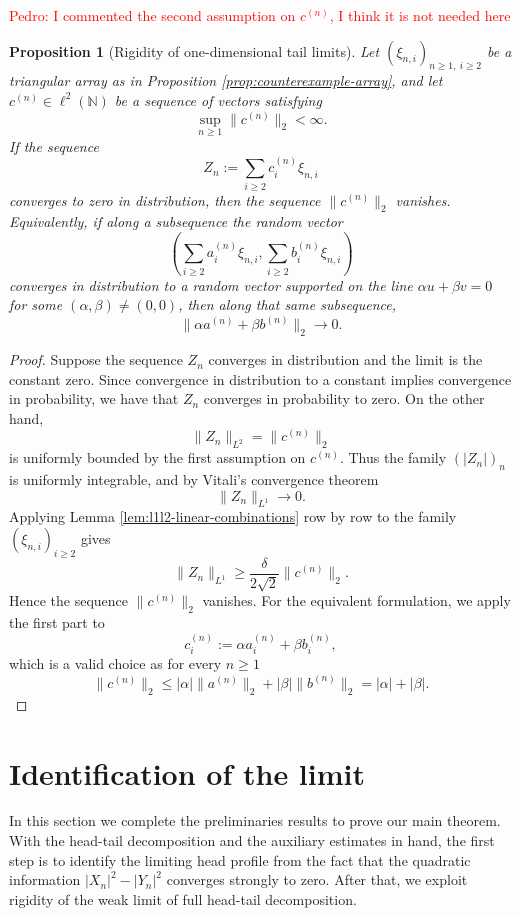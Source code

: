 \documentclass[11pt]{amsart}
\newtheorem{proposition}[theorem]{Proposition}
\newcommand{\N}{\mathbb N}
\begin{document}
\textcolor{red}{Pedro: I commented the second assumption on $c^{(n)}$, I think it is not needed here}
\begin{proposition}[Rigidity of one-dimensional tail limits]
\label{prop:tail-rigidity}
Let $(\xi_{n,i})_{n \ge 1,\ i \ge 2}$ be a triangular array as in
Proposition \ref{prop:counterexample-array}, and let $c^{(n)} \in \ell^2(\N)$
be a sequence of vectors satisfying
\[
\sup_{n\ge1} \|c^{(n)}\|_2 < \infty.
\]
If the sequence
\[
Z_n := \sum_{i \ge 2} c_i^{(n)} \xi_{n,i}
\]
converges to zero in distribution, then the sequence $\|c^{(n)}\|_2$ vanishes. Equivalently, if along a subsequence the random vector
\[
\left(
\sum_{i \ge 2} a_i^{(n)} \xi_{n,i},
\sum_{i \ge 2} b_i^{(n)} \xi_{n,i}
\right)
\]
converges in distribution to a random vector supported on the line $\alpha u + \beta v = 0$ for some
$(\alpha,\beta) \ne (0,0)$, then along that same subsequence,
\[
\|\alpha a^{(n)} + \beta b^{(n)}\|_2 \longrightarrow 0.
\]
\end{proposition}

\begin{proof}
Suppose the sequence $Z_n$ converges in distribution and the limit is the constant zero. Since
convergence in distribution to a constant implies convergence in probability, we have that $Z_n$ converges in probability to zero. On the other hand,
\[
\|Z_n\|_{L^2} = \|c^{(n)}\|_2
\]
is uniformly bounded by the first assumption on $c^{(n)}$. Thus the family $(|Z_n|)_n$ is uniformly
integrable, and by Vitali's convergence theorem
\[
\|Z_n\|_{L^1} \longrightarrow 0.
\]
Applying Lemma \ref{lem:l1l2-linear-combinations} row by row to the family
$(\xi_{n,i})_{i \ge 2}$ gives
\[
\|Z_n\|_{L^1}
\ge
\frac{\delta}{2\sqrt2}\|c^{(n)}\|_2.
\]
Hence the sequence $\|c^{(n)}\|_2$ vanishes. For the equivalent formulation, we apply the first part to
\[
c_i^{(n)} := \alpha a_i^{(n)} + \beta b_i^{(n)},
\]
which is a valid choice as for every $n\ge 1$
\[
\|c^{(n)}\|_2
\le
|\alpha|\|a^{(n)}\|_2 + |\beta|\|b^{(n)}\|_2
=
|\alpha|+|\beta|.
\]
\end{proof}

\section{Identification of the limit}
In this section we complete the preliminaries results to prove our main theorem. With the head-tail decomposition and the auxiliary estimates in hand, the first step is to
identify the limiting head profile from the fact that the quadratic information
$|X_n|^2-|Y_n|^2$ converges strongly to zero. After that, we exploit rigidity of the weak limit of full head-tail
decomposition.
\end{document}
